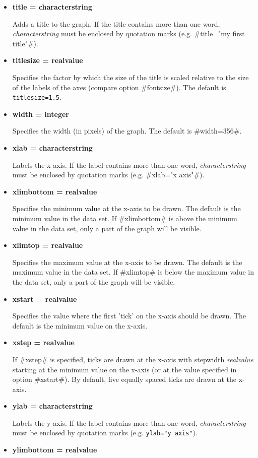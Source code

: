 \begin{itemize}
\item {\bf title = characterstring}

Adds a title to the graph. If the title contains more than one
word, {\em characterstring} must be enclosed by quotation marks (e.g.
#title="my first title"#).

\item {\bf titlesize = realvalue}

Specifies the factor by which the size of the title is scaled
relative to the size of the labels of the axes (compare option
#fontsize#). The default is \texttt{titlesize=1.5}.

\item {\bf width = integer}

Specifies the width (in pixels) of the graph. The default is
#width=356#. \item {\bf xlab = characterstring}

Labels the x-axis. If the label contains more than one word, {\em
characterstring} must be enclosed by quotation marks (e.g.
#xlab="x axis"#). \item {\bf xlimbottom = realvalue}

Specifies the minimum value at the x-axis to be drawn. The default
is the minimum value in the data set. If #xlimbottom# is above the
minimum value in the data set, only a part of the  graph will be
visible.
\item {\bf xlimtop = realvalue}

Specifies the maximum value at the x-axis to be drawn. The default
is the maximum value in the data set. If #xlimtop# is below the
maximum value in the data set, only a part of the  graph will be
visible.
\item {\bf xstart = realvalue}

Specifies the value where the first 'tick' on the x-axis should be
drawn. The default is the minimum value on the x-axis.
\item {\bf xstep = realvalue}

If #xstep# is specified,  ticks are drawn at the x-axis with
stepwidth {\em realvalue} starting at the minimum value on the
x-axis (or at the value specified in option #xstart#). By default,
five equally spaced ticks are drawn at the x-axis. \item {\bf ylab
= characterstring}

Labels the y-axis. If the label contains more than one word, {\em
characterstring} must be enclosed by quotation marks (e.g.
\texttt{ylab="y axis"}). \item {\bf ylimbottom = realvalue}


\end{itemize}
